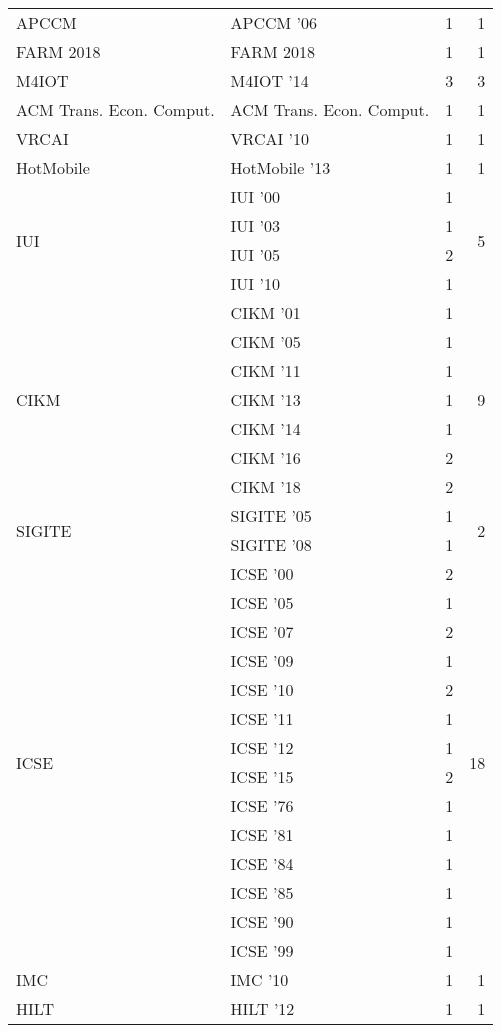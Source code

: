 \begin{table*}[t]
\begin{tabular}{llrr}
\multirow{1}{*}{APCCM } & APCCM '06 & 1 & \multirow{1}{*}{1}\\
\multirow{1}{*}{FARM 2018} & FARM 2018 & 1 & \multirow{1}{*}{1}\\
\multirow{1}{*}{M4IOT } & M4IOT '14 & 3 & \multirow{1}{*}{3}\\
\multirow{1}{*}{ACM Trans. Econ. Comput.} & ACM Trans. Econ. Comput. & 1 & \multirow{1}{*}{1}\\
\multirow{1}{*}{VRCAI } & VRCAI '10 & 1 & \multirow{1}{*}{1}\\
\multirow{1}{*}{HotMobile } & HotMobile '13 & 1 & \multirow{1}{*}{1}\\
\multirow{4}{*}{IUI } & IUI '00 & 1 & \multirow{4}{*}{5}\\
& IUI '03 & 1 &\\
& IUI '05 & 2 &\\
& IUI '10 & 1 &\\
\multirow{7}{*}{CIKM } & CIKM '01 & 1 & \multirow{7}{*}{9}\\
& CIKM '05 & 1 &\\
& CIKM '11 & 1 &\\
& CIKM '13 & 1 &\\
& CIKM '14 & 1 &\\
& CIKM '16 & 2 &\\
& CIKM '18 & 2 &\\
\multirow{2}{*}{SIGITE } & SIGITE '05 & 1 & \multirow{2}{*}{2}\\
& SIGITE '08 & 1 &\\
\multirow{14}{*}{ICSE } & ICSE '00 & 2 & \multirow{14}{*}{18}\\
& ICSE '05 & 1 &\\
& ICSE '07 & 2 &\\
& ICSE '09 & 1 &\\
& ICSE '10 & 2 &\\
& ICSE '11 & 1 &\\
& ICSE '12 & 1 &\\
& ICSE '15 & 2 &\\
& ICSE '76 & 1 &\\
& ICSE '81 & 1 &\\
& ICSE '84 & 1 &\\
& ICSE '85 & 1 &\\
& ICSE '90 & 1 &\\
& ICSE '99 & 1 &\\
\multirow{1}{*}{IMC } & IMC '10 & 1 & \multirow{1}{*}{1}\\
\multirow{1}{*}{HILT } & HILT '12 & 1 & \multirow{1}{*}{1}\\

\end{tabular}
\end{table*}
